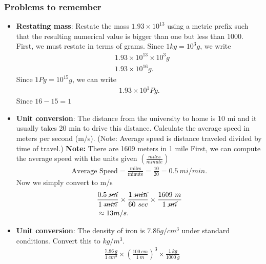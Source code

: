 \documentclass{report}
\begin{document}
    \subsubsection{Problems to remember}
    \begin{itemize}
        \item \textbf{Restating mass}: Restate the mass  $1.93 \times 10^{13}$ using a metric prefix such that the resulting numerical value is bigger than one but less than 1000.
            \bigbreak \noindent 
            First, we must restate in terms of grams. Since $1kg = 10^{3}g$, we write
            \begin{align*}
                &1.93 \times 10^{13} \times 10^{3}g \\
                &1.93 \times 10^{16}g
            .\end{align*}
            Since $1Pg = 10^{15}g$, we can write
            \begin{align*}
               1.93 \times 10^{1}Pg 
            .\end{align*}
            Since $16-15 = 1 $
        \item \textbf{Unit conversion}: The distance from the university to home is 10 mi and it usually takes 20 min to drive this distance. Calculate the average speed in meters per second (m/s). (Note: Average speed is distance traveled divided by time of travel.)
        \bigbreak \noindent 
        \textbf{Note:} There are 1609 meters in 1 mile
        \bigbreak \noindent 
        First, we can compute the average speed with the units given $\left(\frac{miles}{minute}\right)$
        \begin{align*}
            \text{Average Speed} = \frac{\text{miles}}{\text{minute}} = \frac{10}{20} = 0.5\ mi/min
        .\end{align*}
        \bigbreak \noindent 
        Now we simply convert to m/s
        \begin{align*}
            &\frac{0.5\ \cancel{mi}}{1\ \cancel{min}} \times \frac{1\ \cancel{min}}{60\ sec} \times \frac{1609\ m}{1\ \cancel{mi}} \\
            &\approx 13 m/s
        .\end{align*}
    \item \textbf{Unit conversion}: The density of iron is  $7.86 g/cm^{3}$ under standard conditions. Convert this to $kg/m^{3}$.
        \begin{align*}
            &\frac{7.86\ g}{1\ cm^{3}} \times \left(\frac{100\ cm}{1\ m}\right)^{3} \times \frac{1\ kg}{1000\ g} \\

\end{align*}
\end{itemize}
\end{document}
